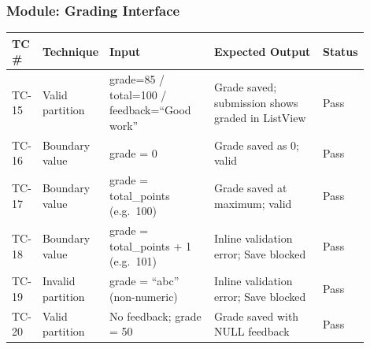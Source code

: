 \documentclass[12pt, a4paper]{article}
\begin{document}
\subsubsection*{Module: Grading Interface}
\begin{center}\small
\begin{tabular}{@{}p{0.06\linewidth}p{0.13\linewidth}p{0.30\linewidth}p{0.33\linewidth}p{0.08\linewidth}@{}}
  \toprule
  \textbf{TC \#} & \textbf{Technique} & \textbf{Input} & \textbf{Expected Output} & \textbf{Status} \\
  \midrule
  TC-15 & Valid partition & grade=85 / total=100 / feedback=``Good work'' & Grade saved; submission shows graded in ListView & \textcolor{success}{Pass} \\
TC-16 & Boundary value  & grade = 0                                     & Grade saved as 0; valid                           & \textcolor{success}{Pass} \\
  TC-17 & Boundary value  & grade = total\_points (e.g.\ 100)             & Grade saved at maximum; valid                     & \textcolor{success}{Pass} \\
TC-18 & Boundary value  & grade = total\_points + 1 (e.g.\ 101)         & Inline validation error; Save blocked             & \textcolor{success}{Pass} \\
  TC-19 & Invalid partition & grade = ``abc'' (non-numeric)               & Inline validation error; Save blocked             & \textcolor{success}{Pass} \\
TC-20 & Valid partition & No feedback; grade = 50                     & Grade saved with NULL feedback                    & \textcolor{success}{Pass} \\
  \bottomrule
\end{tabular}
\end{center}
\end{document}
